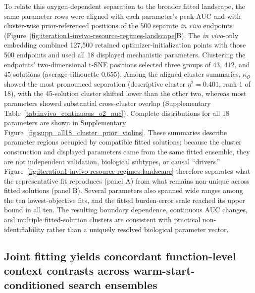 \documentclass[11pt]{article}
\begin{document}
To relate this oxygen-dependent separation to the broader fitted landscape, the same parameter rows were aligned with each parameter's peak AUC and with cluster-wise prior-referenced positions of the 500 separate \textit{in vivo} endpoints (Figure~\ref{fig:iteration1-invivo-resource-regimes-landscape}B). The \textit{in vivo}-only embedding combined 127,500 retained optimizer-initialization points with those 500 endpoints and used all 18 displayed mechanistic parameters. Clustering the endpoints' two-dimensional t-SNE positions selected three groups of 43, 412, and 45 solutions (average silhouette 0.655). Among the aligned cluster summaries, \(\kappa_O\) showed the most pronounced separation (descriptive cluster \(\eta^2=0.401\), rank 1 of 18), with the 45-solution cluster shifted lower than the other two, whereas most parameters showed substantial cross-cluster overlap (Supplementary Table~\ref{tab:invivo_continuous_o2_auc}). Complete distributions for all 18 parameters are shown in Supplementary Figure~\ref{fig:supp_all18_cluster_prior_violins}. These summaries describe parameter regions occupied by compatible fitted solutions; because the cluster construction and displayed parameters came from the same fitted ensemble, they are not independent validation, biological subtypes, or causal ``drivers.'' Figure~\ref{fig:iteration1-invivo-resource-regimes-landscape} therefore separates what the representative fit reproduces (panel A) from what remains non-unique across fitted solutions (panel B). Several parameters also spanned wide ranges among the ten lowest-objective fits, and the fitted burden-error scale reached its upper bound in all ten. The resulting boundary dependence, continuous AUC changes, and multiple fitted-solution clusters are consistent with practical non-identifiability rather than a uniquely resolved biological parameter vector.

\subsection*{Joint fitting yields concordant function-level context contrasts across warm-start-conditioned search ensembles}
\end{document}
